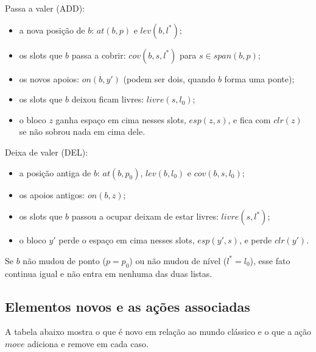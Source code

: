 \documentclass[11pt,a4paper]{article}
\newcommand{\clr}{\mathit{clr}}
\newcommand{\at}{\mathit{at}}
\newcommand{\lev}{\mathit{lev}}
\newcommand{\cov}{\mathit{cov}}
\newcommand{\livre}{\mathit{livre}}
\newcommand{\esp}{\mathit{esp}}
\newcommand{\on}{\mathit{on}}
\newcommand{\mv}{\mathit{move}}
\newcommand{\spn}{\mathit{span}}
\begin{document}
\pagebreak[3]
\noindent Passa a valer (ADD):
\begin{itemize}
  \item a nova posição de $b$: $\at(b,p)$ e $\lev(b,l^\ast)$;
  \item os slots que $b$ passa a cobrir: $\cov(b,s,l^\ast)$ para $s\in\spn(b,p)$;
  \item os novos apoios: $\on(b,y')$ (podem ser dois, quando $b$ forma uma ponte);
  \item os slots que $b$ deixou ficam livres: $\livre(s,l_0)$;
  \item o bloco $z$ ganha espaço em cima nesses slots, $\esp(z,s)$, e fica com
        $\clr(z)$ se não sobrou nada em cima dele.
\end{itemize}
\noindent Deixa de valer (DEL):
\begin{itemize}
  \item a posição antiga de $b$: $\at(b,p_0)$, $\lev(b,l_0)$ e $\cov(b,s,l_0)$;
  \item os apoios antigos: $\on(b,z)$;
  \item os slots que $b$ passou a ocupar deixam de estar livres: $\livre(s,l^\ast)$;
  \item o bloco $y'$ perde o espaço em cima nesses slots, $\esp(y',s)$, e perde
        $\clr(y')$.
\end{itemize}
Se $b$ não mudou de ponto ($p=p_0$) ou não mudou de nível ($l^\ast=l_0$), esse fato
continua igual e não entra em nenhuma das duas listas.

\subsection{Elementos novos e as ações associadas}
A tabela abaixo mostra o que é novo em relação ao mundo clássico e o que a ação
$\mv$ adiciona e remove em cada caso.
\end{document}

